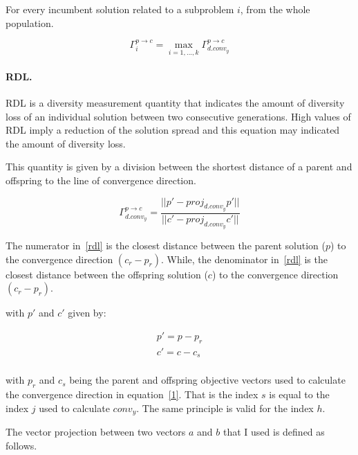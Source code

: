 For every incumbent solution related to a subproblem $i$, from the whole population.

\begin{equation}
\Gamma_{i}^{p \rightarrow c} = \underset{i=1,...,k}{\max} \Gamma_{d.conv_{y}}^{p \rightarrow c}
\end{equation}


\paragraph{RDL.} RDL is a diversity measurement quantity that indicates the amount of diversity loss of an individual solution between two consecutive generations. High values of RDL imply a reduction of the solution spread and this equation may indicated the amount of diversity loss.

This quantity is given by a division between the shortest distance of a parent and offspring to the line of convergence direction.

\begin{equation}
\label{rdl}
\Gamma_{d.conv_{y}}^{p \rightarrow c} = \dfrac{ ||p \prime - proj_{d.conv_{y}}p \prime|| }{||c \prime - proj_{d.conv_{y}}c \prime||}
\end{equation}

The numerator in~\ref{rdl} is the closest distance between the parent solution ($p$) to the convergence direction $(c_r - p_r)$. While, the denominator in~\ref{rdl} is the closest distance between the offspring solution ($c$) to the convergence direction $(c_r - p_r)$. %

with $p\prime$ and $c\prime $ given by:

\begin{equation}
\begin{split}
p\prime = p - p_r\\
c\prime = c - c_s\\
\end{split}
\end{equation}

with $p_r$ and $c_s$ being the parent and offspring objective vectors used to calculate the convergence direction in equation~\ref{1}. That is the index $s$ is equal to the index $j$ used to calculate $conv_{y}$. The same principle is valid for the index $h$.
 
The vector projection between two vectors $a$ and $b$ that I used is defined as follows.

